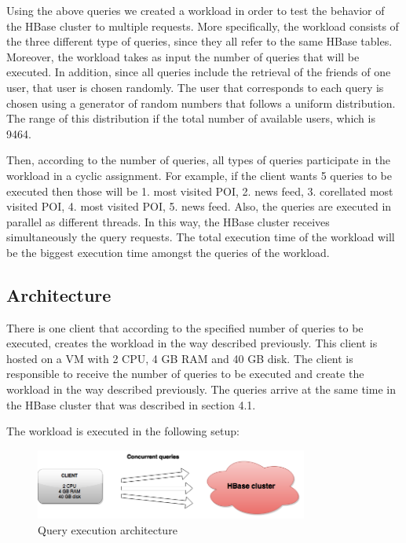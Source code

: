 Using the above queries we created a workload in order to test the behavior of the HBase cluster to multiple requests. More specifically, the workload 
consists of the three different type of queries, since they all refer to the same HBase tables. Moreover, the workload takes as input the number of queries 
that will be executed. In addition, since all queries include the retrieval of the friends of one user, that user is chosen randomly. The user that 
corresponds to each query is chosen using a generator of random numbers that follows a uniform distribution. 
The range of this distribution if the total number of available users, which is 9464.

Then, according to the number of queries, all types of queries participate in the workload in a cyclic assignment. 
For example, if the client wants 5 queries to be executed then those will be 1. most visited POI, 2. news feed, 3. corellated most visited POI, 
4. most visited POI, 5. news feed. Also, the queries are executed in parallel as different threads. In this way, the HBase cluster 
receives simultaneously the query requests. The total execution time of the 
workload will be the biggest execution time amongst the queries of the workload. 

\subsection{Architecture}

There is one client that according to the specified number of queries to be executed, creates the workload in the way described previously. This client is hosted 
on a VM with 2 CPU, 4 GB RAM and 40 GB disk. The client is responsible to receive the number of queries to be executed and create the workload in the way 
described previously. The queries arrive at the same time in the HBase cluster that was described in section 4.1.

The workload is executed in the following setup:

\begin{figure}[H]
  \centering
  \includegraphics[width=0.8\textwidth]{figures/query_ex.png}
  \caption{Query execution architecture}
\end{figure}

